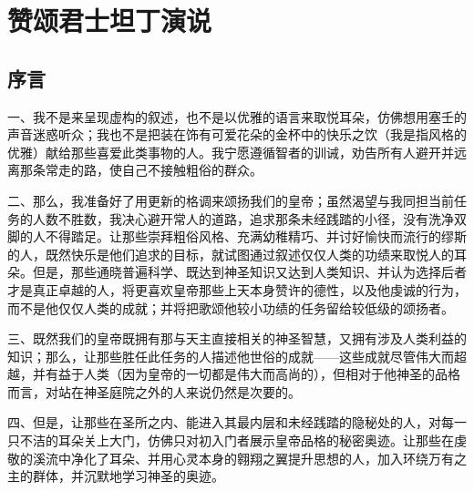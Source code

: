 
\chapter{赞颂君士坦丁演说}


\par


\section{序言}

一、我不是来呈现虚构的叙述，也不是以优雅的语言来取悦耳朵，仿佛想用塞壬的声音迷惑听众；我也不是把装在饰有可爱花朵的金杯中的快乐之饮（我是指风格的优雅）献给那些喜爱此类事物的人。我宁愿遵循智者的训诫，劝告所有人避开并远离那条常走的路，使自己不接触粗俗的群众。\par

二、那么，我准备好了用更新的格调来颂扬我们的皇帝；虽然渴望与我同担当前任务的人数不胜数，我决心避开常人的道路，追求那条未经践踏的小径，没有洗净双脚的人不得踏足。让那些崇拜粗俗风格、充满幼稚精巧、并讨好愉快而流行的缪斯的人，既然快乐是他们追求的目标，就试图通过叙述仅仅人类的功绩来取悦人的耳朵。但是，那些通晓普遍科学、既达到神圣知识又达到人类知识、并认为选择后者才是真正卓越的人，将更喜欢皇帝那些上天本身赞许的德性，以及他虔诚的行为，而不是他仅仅人类的成就；并将把歌颂他较小功绩的任务留给较低级的颂扬者。\par

三、既然我们的皇帝既拥有那与天主直接相关的神圣智慧，又拥有涉及人类利益的知识；那么，让那些胜任此任务的人描述他世俗的成就——这些成就尽管伟大而超越，并有益于人类（因为皇帝的一切都是伟大而高尚的），但相对于他神圣的品格而言，对站在神圣庭院之外的人来说仍然是次要的。\par

四、但是，让那些在圣所之内、能进入其最内层和未经践踏的隐秘处的人，对每一只不洁的耳朵关上大门，仿佛只对初入门者展示皇帝品格的秘密奥迹。让那些在虔敬的溪流中净化了耳朵、并用心灵本身的翱翔之翼提升思想的人，加入环绕万有之主的群体，并沉默地学习神圣的奥迹。\par

